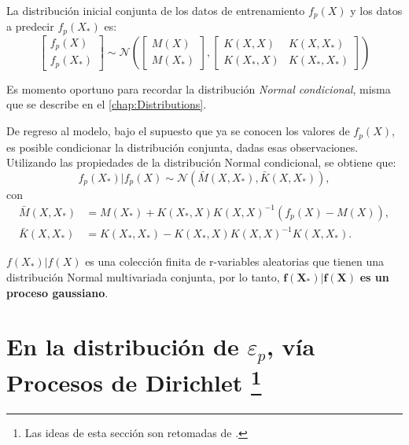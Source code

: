 La distribución inicial conjunta de los datos de entrenamiento $f_p(X)$ y los datos a predecir $f_p(X_*)$ es: 
\begin{equation*}
    \left[
        \begin{array}{c}
        f_p(X)  \\
        f_p(X_*) 
        \end{array}
    \right]  
    \sim \mathcal{N}  
    \left(
        \left[
            \begin{array}{c} 
            M(X) \\ 
            M(X_*) 
            \end{array}
        \right],
        \left[
            \begin{array}{cc}
            K(X,X) & K(X,X_*)  \\
            K(X_*,X) & K(X_*,X_*) 
            \end{array}
        \right]
    \right) 
\end{equation*}

Es momento oportuno para recordar la distribuci\'on \textit{Normal condicional}, misma que se describe en el \autoref{chap:Distributions}.

De regreso al modelo, bajo el supuesto que ya se conocen los valores de $f_p(X)$, es posible condicionar la distribución conjunta, dadas esas observaciones. Utilizando las propiedades de la distribución Normal condicional, se obtiene que:
\begin{equation*}
    f_p(X_*)|f_p(X) 
    \sim \mathcal{N}
    (\bar{M}(X,X_*),\bar{K}(X,X_*)),
\end{equation*}
con
\begin{equation*}
\begin{aligned}
    \bar{M}(X,X_*) &= M(X_*) + K(X_*,X)K(X,X)^{-1}(f_p(X) - M(X)), \\
    \bar{K}(X,X_*) &= K(X_*,X_*) - K(X_*,X)K(X,X)^{-1}K(X,X_*).
\end{aligned}
\end{equation*}

\begin{obs*}
    $f(X_*)|f(X)$ es una colección finita de r-variables aleatorias que tienen una distribuci\'on Normal multivariada conjunta, por lo tanto, $\bm{f(X_*)|f(X)}$ \textbf{es un proceso gaussiano}.
\end{obs*}

\section[En la distribuci\'on de $\varepsilon_p$, v\'ia procesos de Dirichlet]{
    En la distribuci\'on de $\varepsilon_p$, v\'ia Procesos de Dirichlet
    \footnote{Las ideas de esta secci\'on son retomadas de \cite{Yee_DirProc}.}
}

